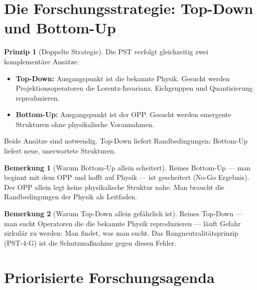 \documentclass[11pt,a4paper]{article}
\theoremstyle{plain}
\theoremstyle{definition}
\newtheorem{remark}{Bemerkung}[section]
\newtheorem{prinzip}{Prinzip}[section]
\begin{document}
\section{Die Forschungsstrategie: Top-Down und Bottom-Up}

\begin{prinzip}[Doppelte Strategie]
Die PST verfolgt gleichzeitig zwei komplementäre Ans\"{a}tze:
\begin{itemize}
  \item \textbf{Top-Down:} Ausgangspunkt ist die bekannte Physik.
        Gesucht werden Projektionsoperatoren die Lorentz-Invarianz,
        Eichgruppen und Quantisierung reproduzieren.
  \item \textbf{Bottom-Up:} Ausgangspunkt ist der OPP. Gesucht werden
        emergente Strukturen ohne physikalische Vorannahmen.
\end{itemize}
Beide Ans\"{a}tze sind notwendig. Top-Down liefert Randbedingungen;
Bottom-Up liefert neue, unerwartete Strukturen.
\end{prinzip}

\begin{remark}[Warum Bottom-Up allein scheitert]
Reines Bottom-Up --- man beginnt mit dem OPP und hofft auf Physik ---
ist gescheitert (No-Go Ergebnis). Der OPP allein legt keine physikalische
Struktur nahe. Man braucht die Randbedingungen der Physik als Leitfaden.
\end{remark}

\begin{remark}[Warum Top-Down allein gef\"{a}hrlich ist]
Reines Top-Down --- man sucht Operatoren die die bekannte Physik
reproduzieren --- l\"{a}uft Gefahr zirkul\"{a}r zu werden: Man findet,
was man sucht. Das Rangneutralit\"{a}tsprinzip (PST-4-G) ist die
Schutzma\ss{}nahme gegen diesen Fehler.
\end{remark}

\section{Priorisierte Forschungsagenda}
\end{document}
